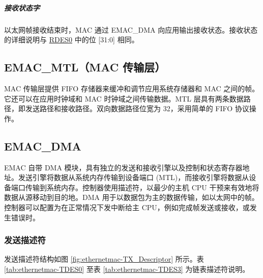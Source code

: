 \documentclass[main\_\_CN.tex]{subfiles}
\begin{document}
\subparagraph{接收状态字}
以太网帧接收结束时，MAC 通过 EMAC\_DMA 向应用输出接收状态。接收状态的详细说明与 \hyperref[tab:ethernetmac-RDES0]{RDES0} 中的位 [31:0] 相同。

\subsection{EMAC\_MTL（MAC 传输层）}
MAC 传输层提供 FIFO 存储器来缓冲和调节应用系统存储器和 MAC 之间的帧。它还可以在应用时钟域和 MAC 时钟域之间传输数据。MTL 层具有两条数据路径，即发送路径和接收路径。双向数据路径位宽为 32，采用简单的 FIFO 协议操作。

\subsection{EMAC\_DMA}
EMAC 自带 DMA 模块，具有独立的发送和接收引擎以及控制和状态寄存器地址。发送引擎将数据从系统内存传输到设备端口 (MTL)，而接收引擎将数据从设备端口传输到系统内存。控制器使用描述符，以最少的主机 CPU 干预来有效地将数据从源移动到目的地。DMA 用于以数据包为主的数据传输，如以太网中的帧。控制器可以配置为在正常情况下发中断给主 CPU，例如完成帧发送或接收，或发生错误时。
\subsubsection{发送描述符}
发送描述符结构如图 \ref{fig:ethernetmac-TX_Descriptor} 所示。表 \ref{tab:ethernetmac-TDES0} 至表 \ref{tab:ethernetmac-TDES3} 为链表描述符说明。
\end{document}
